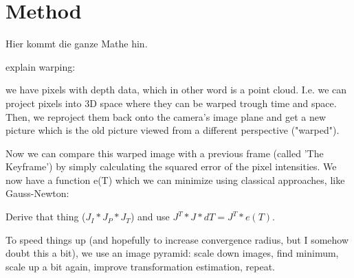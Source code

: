 \chapter{Method}
\label{sec:method}

Hier kommt die ganze Mathe hin.

explain warping:

we have pixels with depth data, which in other word is a point cloud. I.e. we
can project pixels into 3D space where they can be warped trough time and
space. Then, we reproject them back onto the camera's image plane and get a new
picture which is the old picture viewed from a different perspective ("warped").

Now we can compare this warped image with a previous frame (called 'The Keyframe') by simply calculating the squared error of the pixel intensities. We now have a function e(T) which we can minimize using classical approaches, like Gauss-Newton:

Derive that thing ($ J_I * J_P * J_T $) and use $J^T*J*dT = J^T*e(T)$.

To speed things up (and hopefully to increase convergence radius, but I somehow doubt this a bit), we use an image pyramid: scale down images, find minimum, scale up a bit again, improve transformation estimation, repeat.
